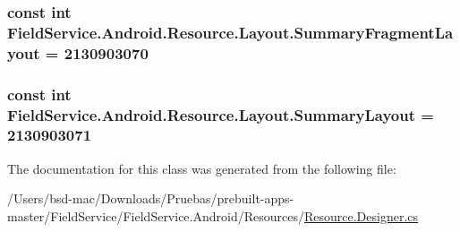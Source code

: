 \hypertarget{class_field_service_1_1_android_1_1_resource_1_1_layout_a95e07a4fbce9ce87d850ee490e99426f}{
\subsubsection[{Summary\+Fragment\+Layout}]{\setlength{\rightskip}{0pt plus 5cm}const int Field\+Service.\+Android.\+Resource.\+Layout.\+Summary\+Fragment\+Layout = 2130903070}}\label{class_field_service_1_1_android_1_1_resource_1_1_layout_a95e07a4fbce9ce87d850ee490e99426f}
\hypertarget{class_field_service_1_1_android_1_1_resource_1_1_layout_a3ed0e2cf2787430c31abf7748af24809}{
\subsubsection[{Summary\+Layout}]{\setlength{\rightskip}{0pt plus 5cm}const int Field\+Service.\+Android.\+Resource.\+Layout.\+Summary\+Layout = 2130903071}}\label{class_field_service_1_1_android_1_1_resource_1_1_layout_a3ed0e2cf2787430c31abf7748af24809}


The documentation for this class was generated from the following file\+:\begin{DoxyCompactItemize}
\item 
/\+Users/bsd-\/mac/\+Downloads/\+Pruebas/prebuilt-\/apps-\/master/\+Field\+Service/\+Field\+Service.\+Android/\+Resources/\hyperlink{_field_service_8_android_2_resources_2_resource_8designer_8cs}{Resource.\+Designer.\+cs}\end{DoxyCompactItemize}
